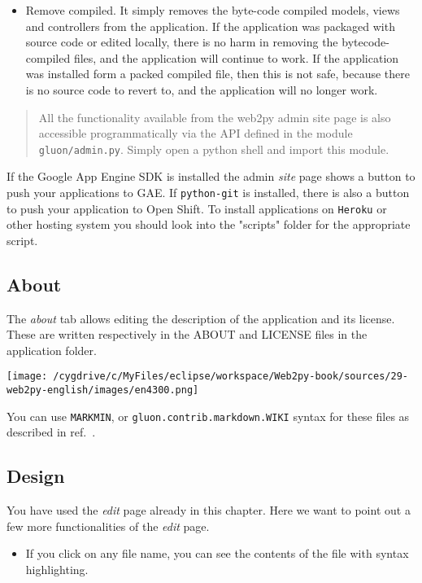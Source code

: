 \documentclass[justified,sixbynine,notoc]{tufte-book}
\def\ft{\small\tt}
\def\inxx#1{\index{#1}}
\begin{document}
\begin{fullwidth}
\begin{itemize}
\item Remove compiled. It simply removes the byte-code compiled models, views and controllers from the application. If the application was packaged with source code or edited locally, there is no harm in removing the bytecode-compiled files, and the application will continue to work. If the application was installed form a packed compiled file, then this is not safe, because there is no source code to revert to, and the application will no longer work.
\end{itemize}

\inxx{admin.py}

\begin{quote}All the functionality available from the web2py admin site page is also accessible programmatically via the API defined in the module {\ft gluon/admin.py}. Simply open a python shell and import this module.\end{quote}
If the Google App Engine SDK is installed the admin {\it site} page shows a button to push your applications to GAE. If {\ft python-git} is installed, there is also a button to push your application to Open Shift. To install applications on {\ft Heroku} or other hosting system you should look into the "scripts" folder for the appropriate script.

\goodbreak\subsection{About}

\inxx{about} \inxx{license}

The {\it about} tab allows editing the description of the application and its license. These are written respectively in the ABOUT and LICENSE files in the application folder.


\goodbreak\begin{center}\texttt{[image: /cygdrive/c/MyFiles/eclipse/workspace/Web2py-book/sources/29-web2py-english/images/en4300.png]}\end{center}


You can use {\ft MARKMIN}, or {\ft gluon.contrib.markdown.WIKI} syntax for these files as described in ref.~\cite{markdown2}.

\goodbreak\subsection{Design}

\inxx{EDIT}
You have used the {\it edit} page already in this chapter. Here we want to point out a few more functionalities of the {\it edit} page.
\begin{itemize}
\item If you click on any file name, you can see the contents of the file with syntax highlighting.


\end{itemize}
\end{fullwidth}
\end{document}
